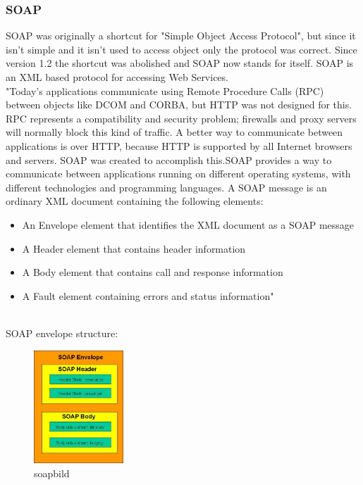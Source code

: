 \documentclass[12pt]{article}
\begin{document}
\subsubsection{SOAP}
SOAP was originally a shortcut for "Simple Object Access Protocol", but since it isn't simple 
and it isn't used to access object only the protocol was correct. Since version 1.2 the shortcut
was abolished and SOAP now stands for itself. SOAP is an XML based protocol for accessing Web Services. \\
"Today's applications communicate using Remote Procedure Calls (RPC) between objects like DCOM and CORBA, but HTTP was not designed for this. RPC represents a compatibility and security problem; firewalls and proxy servers will normally block this kind of traffic. A better way to communicate between applications is over HTTP, because HTTP is supported by all Internet browsers and servers. SOAP was created to accomplish this.SOAP provides a way to communicate between applications running on different operating systems, with different technologies and programming languages. A SOAP message is an ordinary XML document containing the following elements:
\begin{itemize}
\item An Envelope element that identifies the XML document as a SOAP message
\item A Header element that contains header information
\item A Body element that contains call and response information
\item A Fault element containing errors and status information"\cite{soap}
\end{itemize}\\
SOAP envelope structure:\\

\begin{figure}[here!]
	\centering
	\includegraphics[width=0.3\textwidth]{images/soa_envelope}
	\caption{soapbild}
    \label{fig:Soapenvelope}
	\end{figure}
	\FloatBarrier
\end{document}
